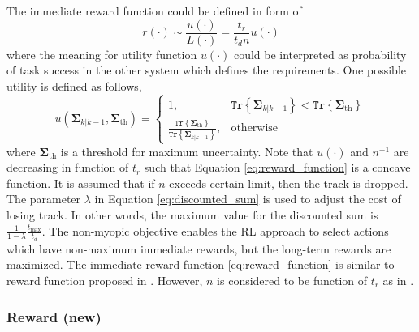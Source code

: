 \documentclass[english, 12pt, a4paper, elec, utf8, a-1b, online]{aaltothesis}
\newcommand{\tr}[1]{\texttt{Tr}\left\{ #1 \right\}}
\newcommand{\priorecov}{\boldsymbol{\Sigma}_{k|k-1}}
\newcommand{\tmax}{t_\text{max}}
\newcommand{\priorecovth}{\bm{\Sigma}_{\text{th}}}
\begin{document}
The immediate reward function could be defined in form of 
\begin{equation}\label{eq:reward_function}
    r(\cdot) \sim \frac{u(\cdot)}{L(\cdot)} = \frac{t_r}{t_d n} u(\cdot)
\end{equation}
where the meaning for utility function $u(\cdot)$ could be interpreted as probability of task success in the other system which defines the requirements.
One possible utility is defined as follows,
\begin{equation}
    u(\priorecov, \priorecovth)  =
    \left\{\begin{array}{ll}
        1, & \tr{\priorecov} < \tr{\priorecovth}  \\
        \frac{\tr{\priorecovth}}{\tr{\priorecov}}, & \text{otherwise}
    \end{array}\right.
\end{equation}
where $\priorecovth$ is a threshold for maximum uncertainty.
Note that $u(\cdot)$ and $n^{-1}$ are decreasing in function of $t_r$ such that Equation \eqref{eq:reward_function} is a concave function.
It is assumed that if $n$ exceeds certain limit, then the track is dropped.
The parameter $\lambda$ in Equation \eqref{eq:discounted_sum} is used to adjust the cost of losing track.
In other words, the maximum value for the discounted sum is $\frac{1}{1-\lambda}\frac{\tmax}{t_d}$.
The non-myopic objective enables the RL approach to select actions which have non-maximum immediate rewards, but the long-term rewards are maximized.
The immediate reward function \eqref{eq:reward_function} is similar to reward function proposed in \cite{Charlish2015}.
However, $n$ is considered to be function of $t_r$ as in \cite{vanKeuk1993}.

\subsubsection{Reward (new)}
\end{document}
